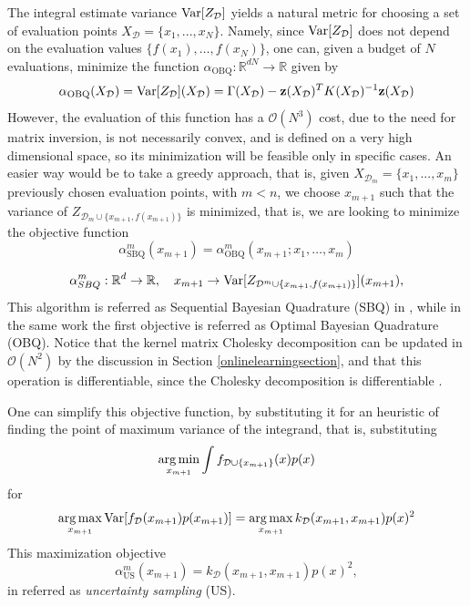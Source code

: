 The integral estimate variance $\mathrm{Var}[Z_{\mathcal{D}}]$ yields a natural metric for choosing a set of evaluation points $X_\mathcal{D} = \{x_1,...,x_N\}$. Namely, since $\mathrm{Var}[Z_\mathcal{D}]$ does not depend on the evaluation values $\{f(x_1),\ldots,f(x_N)\}$, one can, given a budget of $N$ evaluations, minimize the function $\alpha_{\text{OBQ}}:\mathbb{R}^{dN} \to \mathbb{R}$ given by
\begin{equation}\label{optimal_bmc}
\alpha_{\text{OBQ}}(X_\mathcal{D}) =  \mathrm{Var}[Z_{\mathcal{D}}](X_\mathcal{D}) = \Gamma(X_\mathcal{D}) - \mathbf{z}(X_\mathcal{D})^T K(X_\mathcal{D})^{-1} \mathbf{z}(X_\mathcal{D})
\end{equation}
However, the evaluation of this function has a $\mathcal{O}(N^3)$ cost, due to the need for matrix inversion, is not necessarily convex, and is defined on a very high dimensional space, so its minimization will be feasible only in specific cases. An easier way would be to take a greedy approach, that is, given $X_{\mathcal{D}_{m}} = \{x_1,...,x_m\}$ previously chosen evaluation points, with $m < n$, we choose $x_{m+1}$ such that the variance of $Z_{\mathcal{D}_m \cup \{x_{m+1},f(x_{m+1})\}}$ is minimized, that is, we are looking to minimize the objective function 
\begin{equation}
\alpha^m_{\text{SBQ}}(x_{m+1}) = \alpha^m_\text{OBQ}(x_{m+1};x_1,\ldots,x_m)
\end{equation}

\begin{equation}\label{sequential_bmc}
\alpha^m_{SBQ} : \mathbb{R}^d \to \mathbb{R} , \quad x_{m+1} \to \mathrm{Var}[Z_{\mathcal{D}^m \cup \{x_{m+1},f(x_{m+1})\}}](x_{m+1}),
\end{equation}
This algorithm is referred as Sequential Bayesian Quadrature (SBQ) in \cite{Briol_2015}, while in the same work the first objective is referred as Optimal Bayesian Quadrature (OBQ). Notice that the kernel matrix Cholesky decomposition can be updated in $\mathcal{O}(N^2)$ by the discussion in Section \ref{onlinelearningsection}, and that this operation is differentiable, since the Cholesky decomposition is differentiable \cite{Smith_1995,Murray_2016}. 

One can simplify this objective function, by substituting it for an heuristic of finding the point of maximum variance of the integrand, that is, substituting
\begin{equation}
\operatorname*{arg\,min}_{x_{m+1}} \int f_{\mathcal{D} \cup \{x_{m+1}\}}(x) p(x)
\end{equation}
for 
\begin{equation}
\operatorname*{arg\,max}_{x_{m+1}} \mathrm{Var}[f_\mathcal{D}(x_{m+1}) p(x_{m+1})] = \operatorname*{arg\,max}_{x_{m+1}} k_\mathcal{D}(x_{m+1},x_{m+1}) p(x)^2
\end{equation}
This maximization objective 
\begin{equation}\label{us_bmc}
\alpha^m_{\text{US}}(x_{m+1}) = k_\mathcal{D}(x_{m+1},x_{m+1}) p(x)^2 , 
\end{equation}
in referred as \textit{uncertainty sampling} (US).


